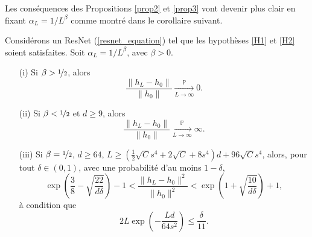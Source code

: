 Les conséquences des Propositions \ref{prop2} et \ref{prop3} vont devenir plus clair en fixant $ \alpha _L = 1/L ^\beta $ comme montré dans le corollaire suivant.
\begin{cor}\label{cor4}
    Considérons un ResNet (\ref{resnet_equation}) tel que les hypothèses \ref{H1} et \ref{H2} soient satisfaites. Soit $ \alpha_L = 1/L^\beta $, avec $ \beta > 0 $.
    \begin{itemize}
        \item[(i)] Si $ \beta > \nicefrac{1}{2} $, alors
        \[
            \frac{\|h_L - h_0\|}{\|h_0\|} \xrightarrow[L \to \infty]{\mathbb{P}} 0.
        \]
        \item[(ii)] Si $ \beta < \nicefrac{1}{2}$ et $d \geq 9 $, alors
        \[
            \frac{\|h_L - h_0\|}{\|h_0\|} \xrightarrow[L \to \infty]{\mathbb{P}} \infty.
        \]
        \item[(iii)] Si $ \beta = \nicefrac{1}{2} $, $ d \geq 64$, $L \geq (\frac{1}{2}\sqrt{C}s^4 + 2\sqrt{C} + 8s^4)d + 96\sqrt{C} s^4 $, alors, pour tout $ \delta \in (0, 1) $, avec une probabilité d'au moins $ 1 - \delta $,
        \[
            \exp\left(\frac{3}{8} - \sqrt{\frac{22}{d\delta}}\right) - 1 < \frac{\|h_L - h_0\|^2}{\|h_0\|^2} < \exp\left(1 + \sqrt{\frac{10}{d\delta}}\right) + 1,
        \]
        à condition que
        \[
            2L \exp\left(-\frac{Ld}{64s^2}\right) \leq \frac{\delta}{11}.
        \]
    \end{itemize}
\end{cor}
